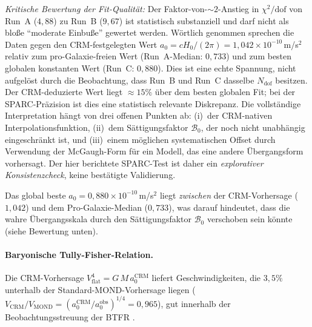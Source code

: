\documentclass[aps,prd,twocolumn,superscriptaddress,nofootinbib]{revtex4-2}
\begin{document}
\textit{Kritische Bewertung der Fit-Qualit\"at:} Der Faktor-von-$\sim 2$-Anstieg in $\chi^2/\mathrm{dof}$ von Run~A ($4{,}88$) zu Run~B ($9{,}67$) ist statistisch substanziell und darf nicht als blo\ss{}e ``moderate Einbu\ss{}e'' gewertet werden. W\"ortlich genommen sprechen die Daten gegen den CRM-festgelegten Wert $a_0 = cH_0/(2\pi) = 1{,}042 \times 10^{-10}$\,m/s$^2$ relativ zum pro-Galaxie-freien Wert (Run~A-Median: $0{,}733$) und zum besten globalen konstanten Wert (Run~C: $0{,}880$). Dies ist eine echte Spannung, nicht aufgel\"ost durch die Beobachtung, dass Run~B und Run~C dasselbe $N_{\mathrm{dof}}$ besitzen. Der CRM-deduzierte Wert liegt $\approx 15\%$ \"uber dem besten globalen Fit; bei der SPARC-Pr\"azision ist dies eine statistisch relevante Diskrepanz. Die vollst\"andige Interpretation h\"angt von drei offenen Punkten ab: (i)~der CRM-nativen Interpolationsfunktion, (ii)~dem S\"attigungsfaktor $\mathcal{B}_0$, der noch nicht unabh\"angig eingeschr\"ankt ist, und (iii)~einem m\"oglichen systematischen Offset durch Verwendung der McGaugh-Form f\"ur ein Modell, das eine andere \"Ubergangsform vorhersagt. Der hier berichtete SPARC-Test ist daher ein \emph{explorativer Konsistenzcheck}, keine best\"atigte Validierung.

Das global beste $a_0 = 0{,}880 \times 10^{-10}$\,m/s$^2$ liegt \textit{zwischen} der CRM-Vorhersage ($1{,}042$) und dem Pro-Galaxie-Median ($0{,}733$), was darauf hindeutet, dass die wahre \"Ubergangs\-skala durch den S\"attigungsfaktor $\mathcal{B}_0$ verschoben sein k\"onnte (siehe Bewertung unten).

\paragraph{Baryonische Tully-Fisher-Relation.}
Die CRM-Vorhersage $V_{\mathrm{flat}}^4 = G\,M\,a_0^{\mathrm{CRM}}$ liefert Geschwindigkeiten, die $3{,}5\%$ unterhalb der Standard-MOND-Vorhersage liegen ($V_{\mathrm{CRM}}/V_{\mathrm{MOND}} = (a_0^{\mathrm{CRM}}/a_0^{\mathrm{obs}})^{1/4} = 0{,}965$), gut innerhalb der Beobachtungsstreuung der BTFR \cite{McGaugh2012}.
\end{document}
